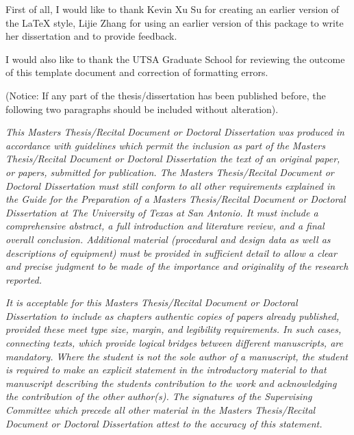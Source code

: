 \begin{acknowledgements}
First of all, I would like to thank Kevin Xu Su for creating an earlier
version of the \LaTeX{} style, Lijie Zhang for using an earlier version
of this package to write her dissertation and to provide feedback. 

I would also like to thank the UTSA Graduate School for reviewing
the outcome of this template document and correction of formatting
errors. 

(Notice: If any part of the thesis/dissertation has been published
before, the following two paragraphs should be included without alteration).

\begin{singlespace}
\emph{This Masters Thesis/Recital Document or Doctoral Dissertation
was produced in accordance with guidelines which permit the inclusion
as part of the Masters Thesis/Recital Document or Doctoral Dissertation
the text of an original paper, or papers, submitted for publication.
The Masters Thesis/Recital Document or Doctoral Dissertation must
still conform to all other requirements explained in the Guide for
the Preparation of a Masters Thesis/Recital Document or Doctoral Dissertation
at The University of Texas at San Antonio. It must include a comprehensive
abstract, a full introduction and literature review, and a final overall
conclusion. Additional material (procedural and design data as well
as descriptions of equipment) must be provided in sufficient detail
to allow a clear and precise judgment to be made of the importance
and originality of the research reported. }

\emph{It is acceptable for this Masters Thesis/Recital Document or
Doctoral Dissertation to include as chapters authentic copies of papers
already published, provided these meet type size, margin, and legibility
requirements. In such cases, connecting texts, which provide logical
bridges between different manuscripts, are mandatory. Where the student
is not the sole author of a manuscript, the student is required to
make an explicit statement in the introductory material to that manuscript
describing the students contribution to the work and acknowledging
the contribution of the other author(s). The signatures of the Supervising
Committee which precede all other material in the Masters Thesis/Recital
Document or Doctoral Dissertation attest to the accuracy of this statement.}\end{singlespace}
\end{acknowledgements}